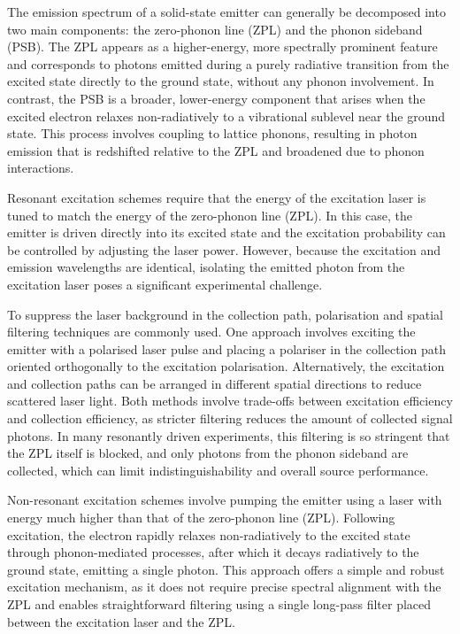 The emission spectrum of a solid-state emitter can generally be decomposed into two main components: the zero-phonon line (ZPL) and the phonon sideband (PSB). The ZPL appears as a higher-energy, more spectrally prominent feature and corresponds to photons emitted during a purely radiative transition from the excited state directly to the ground state, without any phonon involvement. In contrast, the PSB is a broader, lower-energy component that arises when the excited electron relaxes non-radiatively to a vibrational sublevel near the ground state. This process involves coupling to lattice phonons, resulting in photon emission that is redshifted relative to the ZPL and broadened due to phonon interactions.

Resonant excitation schemes require that the energy of the excitation laser is tuned to match the energy of the zero-phonon line (ZPL). In this case, the emitter is driven directly into its excited state and the excitation probability can be controlled by adjusting the laser power. However, because the excitation and emission wavelengths are identical, isolating the emitted photon from the excitation laser poses a significant experimental challenge.

To suppress the laser background in the collection path, polarisation and spatial filtering techniques are commonly used. One approach involves exciting the emitter with a polarised laser pulse and placing a polariser in the collection path oriented orthogonally to the excitation polarisation. Alternatively, the excitation and collection paths can be arranged in different spatial directions to reduce scattered laser light. Both methods involve trade-offs between excitation efficiency and collection efficiency, as stricter filtering reduces the amount of collected signal photons. In many resonantly driven experiments, this filtering is so stringent that the ZPL itself is blocked, and only photons from the phonon sideband are collected, which can limit indistinguishability and overall source performance.

Non-resonant excitation schemes involve pumping the emitter using a laser with energy much higher than that of the zero-phonon line (ZPL). Following excitation, the electron rapidly relaxes non-radiatively to the excited state through phonon-mediated processes, after which it decays radiatively to the ground state, emitting a single photon. This approach offers a simple and robust excitation mechanism, as it does not require precise spectral alignment with the ZPL and enables straightforward filtering using a single long-pass filter placed between the excitation laser and the ZPL.

